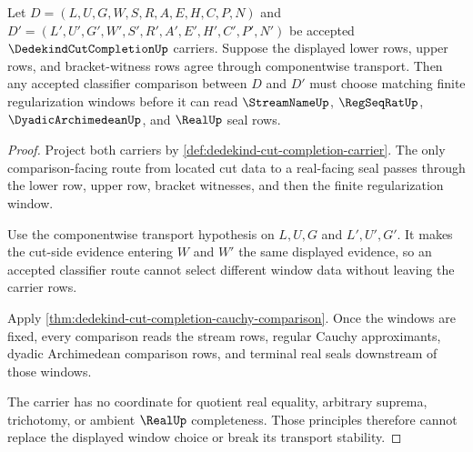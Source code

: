 \begin{theorem}
\label{thm:dedekind-cut-completion-window-determinacy}
Let $D=(L,U,G,W,S,R,A,E,H,C,P,N)$ and $D'=(L',U',G',W',S',R',A',E',H',C',P',N')$ be accepted $\DedekindCutCompletionUp$ carriers. Suppose the displayed lower rows, upper rows, and bracket-witness rows agree through componentwise transport. Then any accepted classifier comparison between $D$ and $D'$ must choose matching finite regularization windows before it can read $\StreamNameUp$, $\RegSeqRatUp$, $\DyadicArchimedeanUp$, and $\RealUp$ seal rows.
\end{theorem}
\begin{proof}
Project both carriers by \autoref{def:dedekind-cut-completion-carrier}. The only comparison-facing route from located cut data to a real-facing seal passes through the lower row, upper row, bracket witnesses, and then the finite regularization window.

Use the componentwise transport hypothesis on $L,U,G$ and $L',U',G'$. It makes the cut-side evidence entering $W$ and $W'$ the same displayed evidence, so an accepted classifier route cannot select different window data without leaving the carrier rows.

Apply \autoref{thm:dedekind-cut-completion-cauchy-comparison}. Once the windows are fixed, every comparison reads the stream rows, regular Cauchy approximants, dyadic Archimedean comparison rows, and terminal real seals downstream of those windows.

The carrier has no coordinate for quotient real equality, arbitrary suprema, trichotomy, or ambient $\RealUp$ completeness. Those principles therefore cannot replace the displayed window choice or break its transport stability.
\end{proof}

\begin{closurestatus}{\DedekindCutCompletionUp}
  \theoryclosure{\seedClosure}
  \formalstatus{\unformalizedV}
\end{closurestatus}
